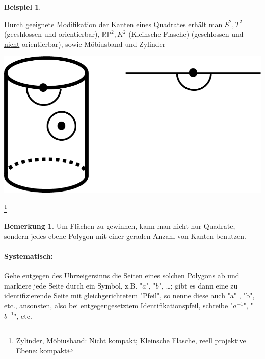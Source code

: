 \documentclass[a4paper,11pt,notitlepage]{report}
\theoremstyle{definition}
\newtheorem{remark}{Bemerkung}[chapter]
\newtheorem{example}{Beispiel}[chapter]
\newcommand{\R}{{\ensuremath{\mathbb{R}}}}
\newcommand{\Prim}{{\ensuremath{\mathbb{P}}}}
\begin{document}
\begin{example}
\begin{center}
	 \end{center}
	Durch geeignete Modifikation der Kanten eines Quadrates erhält man $S^2, T^2$ (gecshlossen und orientierbar), $\R \Prim^2, K^2$ (Kleinsche Flasche) (geschlossen und \underline{nicht} orientierbar), sowie Möbiusband und Zylinder
	\begin{center}
	 	\includegraphics[scale=0.5]{images/2012_01_10_Bild09.png}
	 \end{center}
\end{example}
\footnote{Zylinder, Möbiusband: Nicht kompakt; Kleinsche Flasche, reell projektive Ebene: kompakt}

\begin{remark}
Um Flächen zu gewinnen, kann man nicht nur Quadrate, sondern jedes ebene Polygon mit einer geraden Anzahl von Kanten benutzen.

\paragraph{Systematisch:} Gehe entgegen des Uhrzeigersinns die Seiten eines solchen Polygons ab und markiere jede Seite durch ein Symbol, z.B. "$a$", "$b$", \ldots; gibt es dann eine zu identifizierende Seite mit gleichgerichtetem "Pfeil", so nenne diese auch "a" , "b", etc., ansonsten, also bei entgegengesetztem Identifikationspfeil, schreibe "$a^{-1}$", "$b^{-1}$", etc.
\end{remark}
\end{document}
